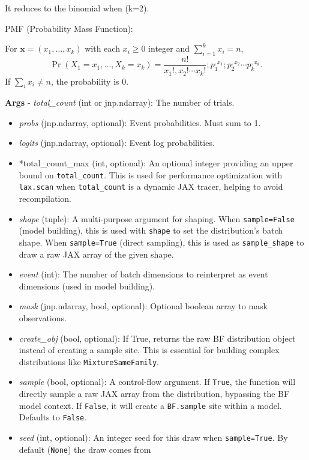 \documentclass[
  letterpaper,
  DIV=11,
  numbers=noendperiod]{scrartcl}
\begin{document}
It reduces to the binomial when (k=2).

PMF (Probability Mass Function):

For \(\mathbf x = (x_1,\dots,x_k)\) with each \(x_i \ge 0\) integer and
\(\sum_{i=1}^k x_i = n\), \[
  \Pr(X_1 = x_1, \dots, X_k = x_k)
  = \frac{n!}{x_1!,x_2!\cdots x_k!}
  ; p_1^{,x_1}; p_2^{,x_2} \cdots p_k^{,x_k}.
  \] If \(\sum_i x_i \neq n\), the probability is 0.

\textbf{Args} - \emph{total\_count} (int or jnp.ndarray): The number of
trials.

\begin{itemize}
\item
  \emph{probs} (jnp.ndarray, optional): Event probabilities. Must sum to
  1.
\item
  \emph{logits} (jnp.ndarray, optional): Event log probabilities.
\item
  *total\_count\_max (int, optional): An optional integer providing an
  upper bound on \texttt{total\_count}. This is used for performance
  optimization with \texttt{lax.scan} when \texttt{total\_count} is a
  dynamic JAX tracer, helping to avoid recompilation.
\item
  \emph{shape} (tuple): A multi-purpose argument for shaping. When
  \texttt{sample=False} (model building), this is used with
  \texttt{shape} to set the distribution's batch shape. When
  \texttt{sample=True} (direct sampling), this is used as
  \texttt{sample\_shape} to draw a raw JAX array of the given shape.
\item
  \emph{event} (int): The number of batch dimensions to reinterpret as
  event dimensions (used in model building).
\item
  \emph{mask} (jnp.ndarray, bool, optional): Optional boolean array to
  mask observations.
\item
  \emph{create\_obj} (bool, optional): If True, returns the raw BF
  distribution object instead of creating a sample site. This is
  essential for building complex distributions like
  \texttt{MixtureSameFamily}.
\item
  \emph{sample} (bool, optional): A control-flow argument. If
  \texttt{True}, the function will directly sample a raw JAX array from
  the distribution, bypassing the BF model context. If \texttt{False},
  it will create a \texttt{BF.sample} site within a model. Defaults to
  \texttt{False}.
\item
  \emph{seed} (int, optional): An integer seed for this draw when
  \texttt{sample=True}. By default (\texttt{None}) the draw comes from

\end{itemize}
\end{document}

